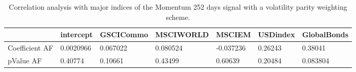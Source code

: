 \begin{table}[H]
\centering
\begin{tabular}{lllllll}
& intercept & GSCICommo & MSCIWORLD & MSCIEM & USDindex & GlobalBonds \\ 
\hline 
Coefficient AF & 0.0020966 & 0.067022 & 0.080524 & -0.037236 & 0.26243 & 0.38041 \\ 
pValue AF & 0.40774 & 0.10661 & 0.43499 & 0.60639 & 0.20484 & 0.083804 \\ 
\hline
\end{tabular}
\caption{Correlation analysis with major indices of the Momentum 252 days signal with a volatility parity weighting scheme.}
\label{MOM252VP_AFACTOR}
\end{table}